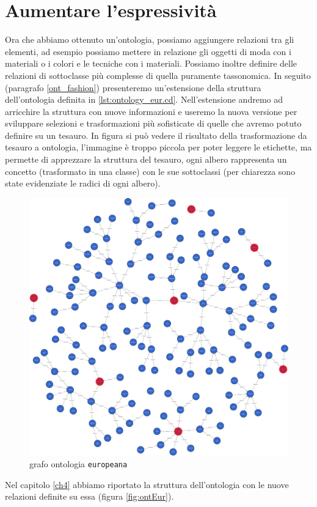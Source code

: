 \section{Aumentare l'espressività}\label{expr}
Ora che abbiamo ottenuto un'ontologia, possiamo aggiungere relazioni tra gli elementi, ad esempio possiamo mettere in relazione gli oggetti di moda con i materiali o i colori e le tecniche con i materiali. Possiamo inoltre definire delle relazioni di sottoclasse più complesse di quella puramente tassonomica.  In seguito (paragrafo \ref{ont_fashion}) presenteremo un'estensione della struttura dell'ontologia definita in \ref{lst:ontology_eur.cd}. Nell'estensione andremo ad arricchire la struttura con nuove informazioni e useremo la nuova versione per sviluppare selezioni e trasformazioni più sofisticate di quelle che avremo potuto definire su un tesauro. In figura si può vedere il risultato della trasformazione da tesauro a ontologia, l'immagine è troppo piccola per poter leggere le etichette, ma permette di apprezzare la struttura del tesauro, ogni albero rappresenta un concetto (trasformato in una classe) con le sue sottoclassi (per chiarezza sono state evidenziate le radici di ogni albero).
\begin{figure}[H]
	\centering
	\includegraphics[width=\textwidth]{Picture/europeana_tree.pdf}
	 \caption[Caption for LOF]{grafo ontologia \texttt{europeana}\footnotemark}
\end{figure}
Nel capitolo \ref{ch4} abbiamo riportato la struttura dell'ontologia con le nuove relazioni definite su essa (figura \ref{fig:ontEur}).

